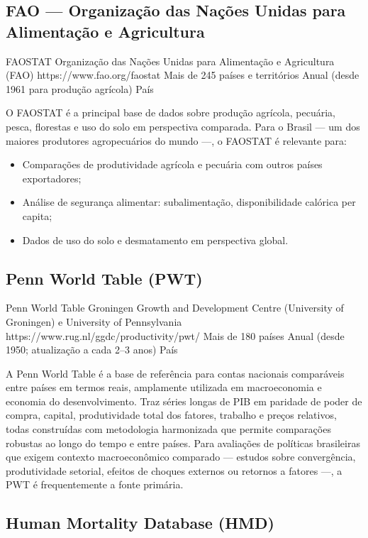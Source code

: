\subsection{FAO --- Organização das Nações Unidas para Alimentação e Agricultura}

\ficharapida
  {FAOSTAT}
  {Organização das Nações Unidas para Alimentação e Agricultura (FAO)}
  {https://www.fao.org/faostat}
  {Mais de 245 países e territórios}
  {Anual (desde 1961 para produção agrícola)}
  {País}

O FAOSTAT é a principal base de dados sobre produção agrícola, pecuária, pesca, florestas e uso do solo em perspectiva comparada. Para o Brasil --- um dos maiores produtores agropecuários do mundo ---, o FAOSTAT é relevante para:
\begin{itemize}
  \item Comparações de produtividade agrícola e pecuária com outros países exportadores;
  \item Análise de segurança alimentar: subalimentação, disponibilidade calórica per capita;
  \item Dados de uso do solo e desmatamento em perspectiva global.
\end{itemize}

\subsection{Penn World Table (PWT)}

\ficharapida
  {Penn World Table}
  {Groningen Growth and Development Centre (University of Groningen) e University of Pennsylvania}
  {https://www.rug.nl/ggdc/productivity/pwt/}
  {Mais de 180 países}
  {Anual (desde 1950; atualização a cada 2--3 anos)}
  {País}

A Penn World Table é a base de referência para contas nacionais comparáveis entre países em termos reais, amplamente utilizada em macroeconomia e economia do desenvolvimento. Traz séries longas de PIB em paridade de poder de compra, capital, produtividade total dos fatores, trabalho e preços relativos, todas construídas com metodologia harmonizada que permite comparações robustas ao longo do tempo e entre países. Para avaliações de políticas brasileiras que exigem contexto macroeconômico comparado --- estudos sobre convergência, produtividade setorial, efeitos de choques externos ou retornos a fatores ---, a PWT é frequentemente a fonte primária.

\subsection{Human Mortality Database (HMD)}

